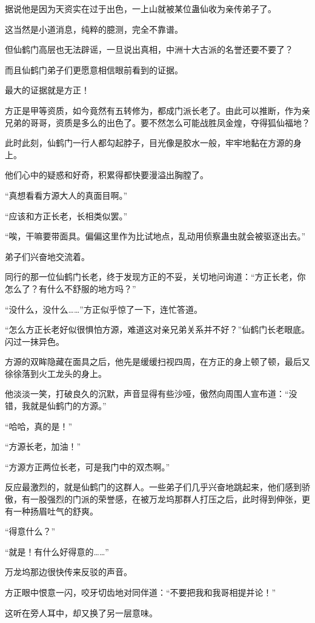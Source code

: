 \begin{this_body}
据说他是因为天资实在过于出色，一上山就被某位蛊仙收为亲传弟子了。

这当然是小道消息，纯粹的臆测，完全不靠谱。

但仙鹤门高层也无法辟谣，一旦说出真相，中洲十大古派的名誉还要不要了？

而且仙鹤门弟子们更愿意相信眼前看到的证据。

最大的证据就是方正！

方正是甲等资质，如今竟然有五转修为，都成门派长老了。由此可以推断，作为亲兄弟的哥哥，资质是多么的出色了。要不然怎么可能战胜凤金煌，夺得狐仙福地？

此时此刻，仙鹤门一行人都勾起脖子，目光像是胶水一般，牢牢地黏在方源的身上。

他们心中的疑惑和好奇，积累得都快要漫溢出胸膛了。

“真想看看方源大人的真面目啊。”

“应该和方正长老，长相类似罢。”

“唉，干嘛要带面具。偏偏这里作为比试地点，乱动用侦察蛊虫就会被驱逐出去。”

弟子们兴奋地交流着。

同行的那一位仙鹤门长老，终于发现方正的不妥，关切地问询道：“方正长老，你怎么了？有什么不舒服的地方吗？”

“没什么，没什么……”方正似乎惊了一下，连忙答道。

“怎么方正长老好似很惧怕方源，难道这对亲兄弟关系并不好？”仙鹤门长老眼底。闪过一抹异色。

方源的双眸隐藏在面具之后，他先是缓缓扫视四周，在方正的身上顿了顿，最后又徐徐落到火工龙头的身上。

他淡淡一笑，打破良久的沉默，声音显得有些沙哑，傲然向周围人宣布道：“没错，我就是仙鹤门的方源。”

“哈哈，真的是！”

“方源长老，加油！”

“方源方正两位长老，可是我门中的双杰啊。”

反应最激烈的，就是仙鹤门的这群人。一些弟子们几乎兴奋地跳起来，他们感到骄傲，有一股强烈的门派的荣誉感，在被万龙坞那群人打压之后，此时得到伸张，更有一种扬眉吐气的舒爽。

“得意什么？”

“就是！有什么好得意的……”

万龙坞那边很快传来反驳的声音。

方正眼中恨意一闪，咬牙切齿地对同伴道：“不要把我和我哥相提并论！”

这听在旁人耳中，却又换了另一层意味。


\end{this_body}
